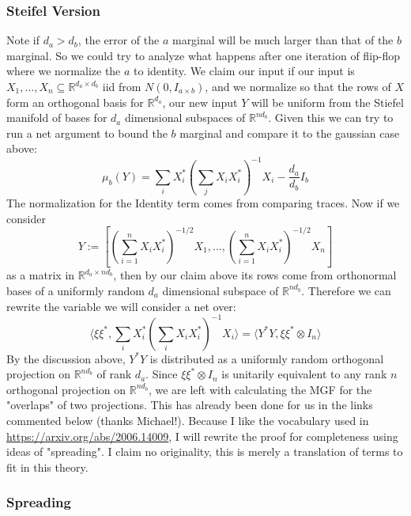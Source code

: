 \documentclass{article}
\newcommand{\R}{{\mathbb{R}}}
\begin{document}
\subsubsection{Steifel Version}

Note if $d_{a} > d_{b}$, the error of the $a$ marginal will be much larger than that of the $b$ marginal. So we could try to analyze what happens after one iteration of flip-flop where we normalize the $a$ to identity. We claim our input if our input is $X_{1}, ..., X_{n} \subseteq \R^{d_{a} \times d_{b}}$ iid from $N(0,I_{a \times b})$, and we normalize so that the rows of $X$ form an orthogonal basis for $\R^{d_{a}}$, our new input $Y$ will be uniform from the Stiefel manifold of bases for $d_{a}$ dimensional subspaces of $\R^{nd_{b}}$. Given this we can try to run a net argument to bound the $b$ marginal and compare it to the gaussian case above:
\[ \mu_{b}(Y) = \sum_{i} X_{i}^{*} \left( \sum_{j} X_{i} X_{i}^{*} \right)^{-1} X_{i} - \frac{d_{a}}{d_{b}} I_{b}      \]
The normalization for the Identity term comes from comparing traces. Now if we consider 
\[ Y := \left[ \left( \sum_{i=1}^{n} X_{i} X_{i}^{*} \right)^{-1/2} X_{1}, ..., \left( \sum_{i=1}^{n} X_{i} X_{i}^{*} \right)^{-1/2} X_{n}     \right]   \]
as a matrix in $\R^{d_{a} \times nd_{b}}$, then by our claim above its rows come from orthonormal bases of a uniformly random $d_{a}$ dimensional subspace of $\R^{n d_{b}}$. Therefore we can rewrite the variable we will consider a net over:
\[ \langle \xi \xi^{*}, \sum_{i} X_{i}^{*} \left( \sum_{i} X_{i} X_{i}^{*}  \right)^{-1} X_{i} \rangle = \langle Y^{*} Y, \xi \xi^{*} \otimes I_{n}   \rangle     \]
By the discussion above, $Y^{*} Y$ is distributed as a uniformly random orthogonal projection on $\R^{n d_{b}}$ of rank $d_{a}$. Since $\xi \xi^{*} \otimes I_{n}$ is unitarily equivalent to any rank $n$ orthogonal projection on $\R^{n d_{b}}$, we are left with calculating the MGF for the "overlaps" of two projections. This has already been done for us in the links commented below (thanks Michael!). 
Because I like the vocabulary used in \url{https://arxiv.org/abs/2006.14009}, I will rewrite the proof for completeness using ideas of "spreading". I claim no originality, this is merely a translation of terms to fit in this theory. 

\subsubsection{Spreading}
\end{document}
